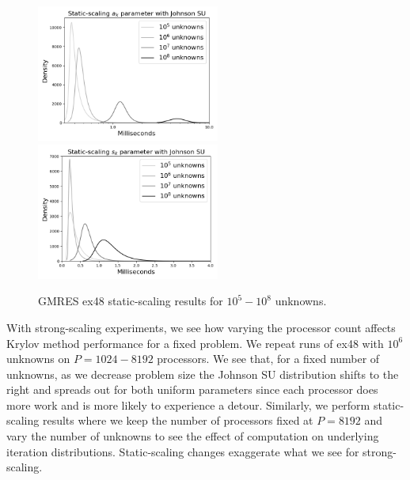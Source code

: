 \documentclass[sigconf, anonymous]{acmart}
\begin{document}
\begin{figure}[b]
\centering
\includegraphics[width=6cm]{../plots/GMRES_ex48_1000000_a_k_static_scaling_johnsonsu.png}
\includegraphics[width=6cm]{../plots/PGMRES_ex48_1000000_s_k_static_scaling_johnsonsu.png} 
\caption{GMRES ex48 static-scaling results for $10^5 - 10^8$ unknowns.} \label{fig:static-scaling}
\end{figure}

With strong-scaling experiments, we see how varying the processor count affects Krylov method performance for a fixed problem. We repeat runs of ex48 with  $10^6$ unknowns on $P = 1024 - 8192$ processors. 
We see that, for a fixed number of unknowns, as we decrease problem size the Johnson SU distribution shifts to the right and spreads out for both uniform parameters since each processor does more work and is more likely to experience a detour. 
Similarly, we perform static-scaling results where we keep the number of processors fixed at $P=8192$ and vary the number of unknowns to see the effect of computation on underlying iteration distributions.
Static-scaling changes exaggerate what we see for strong-scaling.

\end{document}
